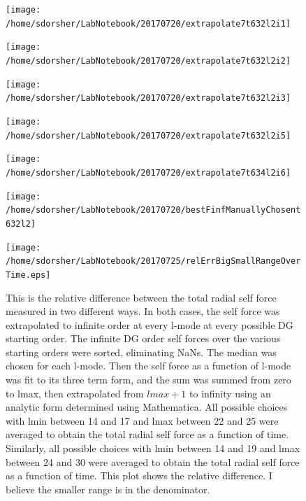 \documentclass{article}
\begin{document}
\begin{figure}
  \texttt{[image: /home/sdorsher/LabNotebook/20170720/extrapolate7t632l2i1]}
\end{figure}

\begin{figure}
  \texttt{[image: /home/sdorsher/LabNotebook/20170720/extrapolate7t632l2i2]}
\end{figure}

\begin{figure}
  \texttt{[image: /home/sdorsher/LabNotebook/20170720/extrapolate7t632l2i3]}
\end{figure}

\begin{figure}
  \texttt{[image: /home/sdorsher/LabNotebook/20170720/extrapolate7t632l2i5]}
\end{figure}

\begin{figure}
  \texttt{[image: /home/sdorsher/LabNotebook/20170720/extrapolate7t634l2i6]}
\end{figure}

\begin{figure}
  \texttt{[image: /home/sdorsher/LabNotebook/20170720/bestFinfManuallyChosent632l2]}
\end{figure}




\begin{figure}
  \texttt{[image: /home/sdorsher/LabNotebook/20170725/relErrBigSmallRangeOverTime.eps]}
  \caption{This is the relative difference between the total radial self force measured in two different ways. In both cases, the self force was extrapolated to infinite order at every l-mode at every possible DG starting order. The infinite DG order self forces over the various starting orders were sorted, eliminating NaNs. The median was chosen for each l-mode. Then the self force as a function of l-mode was fit to its three term form, and the sum was summed from zero to lmax, then extrapolated from $lmax +1 $ to infinity using an analytic form determined using Mathematica. All possible choices with lmin between 14 and 17 and lmax between 22 and 25 were averaged to obtain the total radial self force as a function of time. Similarly, all possible choices with lmin between 14 and 19 and lmax between 24 and 30 were averaged to obtain the total radial self force as a function of time. This plot shows the relative difference. I believe the smaller range is in the denominator.}
\end{figure}
\end{document}

